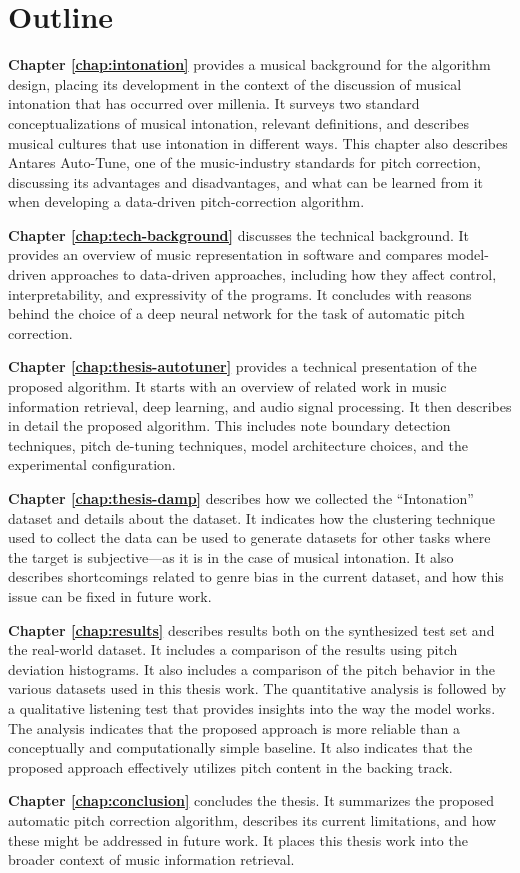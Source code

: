 \section{Outline}
\textbf{Chapter \ref{chap:intonation}} provides a musical background for the algorithm design, placing its development in the context of the discussion of musical intonation that has occurred over millenia. It surveys two standard conceptualizations of musical intonation, relevant definitions, and describes musical cultures that use intonation in different ways. This chapter also describes Antares Auto-Tune, one of the music-industry standards for pitch correction, discussing its advantages and disadvantages, and what can be learned from it when developing a data-driven pitch-correction algorithm. 

\textbf{Chapter \ref{chap:tech-background}} discusses the technical background. It provides an overview of music representation in software and compares model-driven approaches to data-driven approaches, including how they affect control, interpretability, and expressivity of the programs. It concludes with reasons behind the choice of a deep neural network for the task of automatic pitch correction.

\textbf{Chapter \ref{chap:thesis-autotuner}} provides a technical presentation of the proposed algorithm. It starts with an overview of related work in music information retrieval, deep learning, and audio signal processing. It then describes in detail the proposed algorithm. This includes note boundary detection techniques, pitch de-tuning techniques, model architecture choices, and the experimental configuration.

\textbf{Chapter \ref{chap:thesis-damp}} describes how we collected the ``Intonation'' dataset and details about the dataset. It indicates how the clustering technique used to collect the data can be used to generate datasets for other tasks where the target is subjective---as it is in the case of musical intonation. It also describes shortcomings related to genre bias in the current dataset, and how this issue can be fixed in future work.

\textbf{Chapter \ref{chap:results}} describes results both on the synthesized test set and the real-world dataset. It includes a comparison of the results using pitch deviation histograms. It also includes a comparison of the pitch behavior in the various datasets used in this thesis work. The quantitative analysis is followed by a qualitative listening test that provides insights into the way the model works. The analysis indicates that the proposed approach is more reliable than a conceptually and computationally simple baseline. It also indicates that the proposed approach effectively utilizes pitch content in the backing track.

\textbf{Chapter \ref{chap:conclusion}} concludes the thesis. It summarizes the proposed automatic pitch correction algorithm, describes its current limitations, and how these might be addressed in future work. It places this thesis work into the broader context of music information retrieval.

